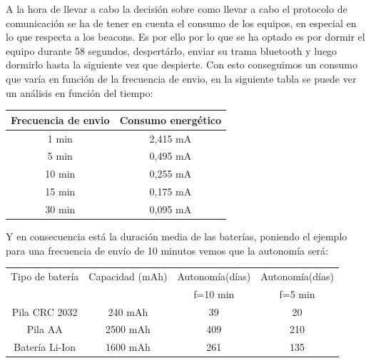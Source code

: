 \documentclass[a4paper ,12pt, onecolumn]{article}
\begin{document}
            A la hora de llevar a cabo la decisión sobre como llevar a cabo el protocolo de comunicación se ha de tener en cuenta 
            el consumo de los equipos, en especial en lo que respecta a los beacons.
            Es por ello por lo que se ha optado es por dormir el equipo durante 58 segundos, despertárlo,
            enviar su trama bluetooth y luego dormirlo hasta la siguiente vez que despierte.
            Con esto conseguimos un consumo que varía en función de la frecuencia de envio, en la siguiente tabla
            se puede ver un análisis en función del tiempo:
            \begin{center}
                \begin{tabular}{||c || c ||} 
                \hline
                Frecuencia de envio  & Consumo energético  \\ [0.5ex] 
                \hline
                1 min &  2,415 mA \\
                5 min &  0,495 mA \\ 
                10 min &  0,255 mA \\ 
                15 min &  0,175 mA \\ 
                30 min &  0,095 mA \\ 
                \hline
                \end{tabular}
            \end{center}
            Y en consecuencia está la duración media de las baterías, poniendo el ejemplo para una frecuencia de 
            envío de 10 minutos vemos que la autonomía será:
            \begin{center}
                \begin{tabular}{|c | c| c| c |} 
                \hline
                Tipo de batería & Capacidad (mAh) & Autonomía(días) & Autonomía(días)   \\ [0.5ex] 
                &  &  f=10 min &  f=5 min   \\ [0.5ex] 
                \hline
                \hline
                    Pila CRC 2032 &  240 mAh  & 39   & 20 \\ 
                    Pila AA       &  2500 mAh & 409  & 210 \\ 
                    Batería Li-Ion&  1600 mAh & 261  & 135 \\ 
                \hline
                \end{tabular}
            \end{center}
            
\end{document}
